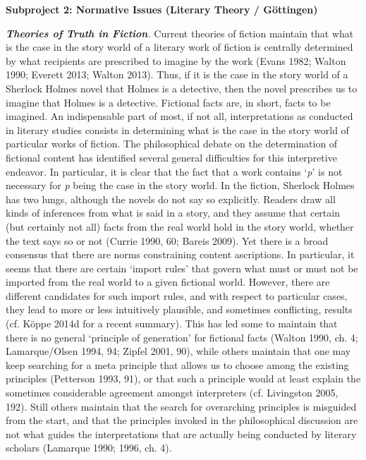 
\vspace{.2cm}
\noindent\textbf{Subproject 2: Normative Issues (Literary Theory / G\"ottingen)}
\vspace{.2cm}

\noindent\textbf{\emph{Theories of Truth in Fiction}}\emph{.} Current theories of fiction maintain that what is the case in the story world of a literary work of fiction is centrally determined by what recipients are prescribed to imagine by the work (Evans 1982; Walton 1990; Everett 2013; Walton 2013). Thus, if it is the case in the story world of a Sherlock Holmes novel that Holmes is a detective, then the novel prescribes us to imagine that Holmes is a detective. Fictional facts are, in short, facts to be imagined. An indispensable part of most, if not all, interpretations as conducted in literary studies consists in determining what is the case in the story world of particular works of fiction. The philosophical debate on the determination of fictional content has identified several general difficulties for this interpretive endeavor. In particular, it is clear that the fact that a work contains `\emph{p}' is not necessary for \emph{p} being the case in the story world. In the fiction, Sherlock Holmes has two lungs, although the novels do not say so explicitly. Readers draw all kinds of inferences from what is said in a story, and they assume that certain (but certainly not all) facts from the real world hold in the story world, whether the text says so or not (Currie 1990, 60; Bareis 2009). Yet there is a broad consensus that there are norms constraining content ascriptions. In particular, it seems that there are certain `import rules' that govern what must or must not be imported from the real world to a given fictional world. However, there are different candidates for such import rules, and with respect to particular cases, they lead to more or less intuitively plausible, and sometimes conflicting, results (cf. K\"oppe 2014d for a recent summary). This has led some to maintain that there is no general `principle of generation' for fictional facts (Walton 1990, ch. 4; Lamarque/Olsen 1994, 94; Zipfel 2001, 90), while others maintain that one may keep searching for a meta principle that allows us to choose among the existing principles (Petterson 1993, 91), or that such a principle would at least explain the sometimes considerable agreement amongst interpreters (cf. Livingston 2005, 192). Still others maintain that the search for overarching principles is misguided from the start, and that the principles invoked in the philosophical discussion are not what guides the interpretations that are actually being conducted by literary scholars (Lamarque 1990; 1996, ch. 4).

